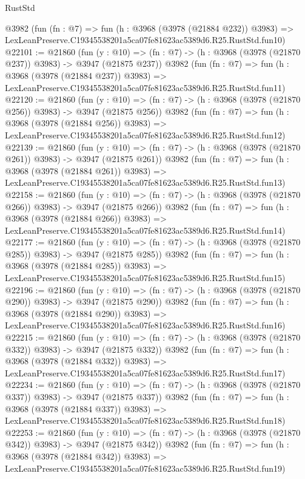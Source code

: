 \begin{lexlean}{RustStd}
\begin{coremodule}
    @3982
    (fun (fn : @7) =>
    fun (h : @3968 (@3978 (@21884 @232)) @3983) =>
    LexLeanPreserve.C19345538201a5ca07fe81623ac5389d6.R25.RustStd.fun10)
@22101 := @21860
    (fun (y : @10) => (fn : @7) -> (h : @3968 (@3978 (@21870 @237)) @3983) -> @3947 (@21875 @237))
    @3982
    (fun (fn : @7) =>
    fun (h : @3968 (@3978 (@21884 @237)) @3983) =>
    LexLeanPreserve.C19345538201a5ca07fe81623ac5389d6.R25.RustStd.fun11)
@22120 := @21860
    (fun (y : @10) => (fn : @7) -> (h : @3968 (@3978 (@21870 @256)) @3983) -> @3947 (@21875 @256))
    @3982
    (fun (fn : @7) =>
    fun (h : @3968 (@3978 (@21884 @256)) @3983) =>
    LexLeanPreserve.C19345538201a5ca07fe81623ac5389d6.R25.RustStd.fun12)
@22139 := @21860
    (fun (y : @10) => (fn : @7) -> (h : @3968 (@3978 (@21870 @261)) @3983) -> @3947 (@21875 @261))
    @3982
    (fun (fn : @7) =>
    fun (h : @3968 (@3978 (@21884 @261)) @3983) =>
    LexLeanPreserve.C19345538201a5ca07fe81623ac5389d6.R25.RustStd.fun13)
@22158 := @21860
    (fun (y : @10) => (fn : @7) -> (h : @3968 (@3978 (@21870 @266)) @3983) -> @3947 (@21875 @266))
    @3982
    (fun (fn : @7) =>
    fun (h : @3968 (@3978 (@21884 @266)) @3983) =>
    LexLeanPreserve.C19345538201a5ca07fe81623ac5389d6.R25.RustStd.fun14)
@22177 := @21860
    (fun (y : @10) => (fn : @7) -> (h : @3968 (@3978 (@21870 @285)) @3983) -> @3947 (@21875 @285))
    @3982
    (fun (fn : @7) =>
    fun (h : @3968 (@3978 (@21884 @285)) @3983) =>
    LexLeanPreserve.C19345538201a5ca07fe81623ac5389d6.R25.RustStd.fun15)
@22196 := @21860
    (fun (y : @10) => (fn : @7) -> (h : @3968 (@3978 (@21870 @290)) @3983) -> @3947 (@21875 @290))
    @3982
    (fun (fn : @7) =>
    fun (h : @3968 (@3978 (@21884 @290)) @3983) =>
    LexLeanPreserve.C19345538201a5ca07fe81623ac5389d6.R25.RustStd.fun16)
@22215 := @21860
    (fun (y : @10) => (fn : @7) -> (h : @3968 (@3978 (@21870 @332)) @3983) -> @3947 (@21875 @332))
    @3982
    (fun (fn : @7) =>
    fun (h : @3968 (@3978 (@21884 @332)) @3983) =>
    LexLeanPreserve.C19345538201a5ca07fe81623ac5389d6.R25.RustStd.fun17)
@22234 := @21860
    (fun (y : @10) => (fn : @7) -> (h : @3968 (@3978 (@21870 @337)) @3983) -> @3947 (@21875 @337))
    @3982
    (fun (fn : @7) =>
    fun (h : @3968 (@3978 (@21884 @337)) @3983) =>
    LexLeanPreserve.C19345538201a5ca07fe81623ac5389d6.R25.RustStd.fun18)
@22253 := @21860
    (fun (y : @10) => (fn : @7) -> (h : @3968 (@3978 (@21870 @342)) @3983) -> @3947 (@21875 @342))
    @3982
    (fun (fn : @7) =>
    fun (h : @3968 (@3978 (@21884 @342)) @3983) =>
    LexLeanPreserve.C19345538201a5ca07fe81623ac5389d6.R25.RustStd.fun19)

\end{coremodule}
\end{lexlean}
